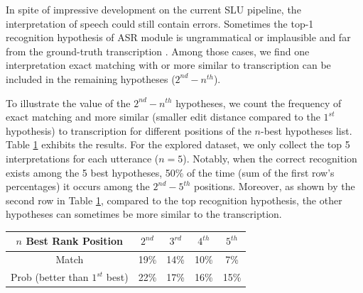 In spite of impressive development on the current SLU pipeline, the interpretation of speech could still contain errors.
Sometimes the top-1 recognition hypothesis of ASR module is ungrammatical or implausible and far from the ground-truth transcription \citep{peng2013search, jyothi2012large}. 
Among those cases, we find one interpretation exact matching with or more similar to transcription can be included in the remaining hypotheses ($2^{nd}- n^{th}$). 

To illustrate the value of the $2^{nd}- n^{th}$ hypotheses, we count the frequency of exact matching and more similar (smaller edit distance compared to the $1^{st}$ hypothesis) to  transcription for different positions of the $n$-best hypotheses list.
Table \ref{tbl:nbest} exhibits the results. For the explored dataset, we only collect the top 5 interpretations for each utterance ($n = 5$). Notably, when the correct recognition exists among the 5 best hypotheses, 50\% of the time (sum of the first row's percentages) it occurs among the $2^{nd}-5^{th}$ positions. Moreover, as shown by the second row in Table \ref{tbl:nbest}, compared to the top recognition hypothesis, the other hypotheses can sometimes be more similar to the transcription. 



\begin{table}[h]
	\vspace{-1.5ex}
	\label{tbl:nbest}
	\centering
	\begin{tabular}{|c|c c c c|} 
		\hline
		$n$ Best Rank Position & $2^{nd}$ & $3^{rd}$ & $4^{th}$ & $5^{th}$ \\
		\hline
		Match&19\%&14\%&10\%&7\%\\
		Prob (better than $1^{st}$ best) & 22\%&17\%&16\%&15\%\\
		\hline
	\end{tabular}
	\vspace{-2ex}
\end{table}

